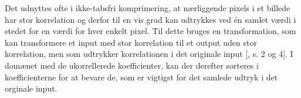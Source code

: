 Det udnyttes ofte i ikke-tabsfri komprimering, at nærliggende pixels i et billede har stor korrelation og derfor til en vis grad kan udtrykkes ved én samlet værdi i stedet for en værdi for hver enkelt pixel. Til dette bruges en transformation, som kan transformere et input med stor korrelation til et output uden stor korrelation, men som udtrykker korrelationen i det originale input [\citet{lokminglui_DCT}, s. 2 og 4]. I domænet med de ukorrellerede koefficienter, kan der derefter sorteres i koefficienterne for at bevare de, som er vigtigst for det samlede udtryk i det orginale input.